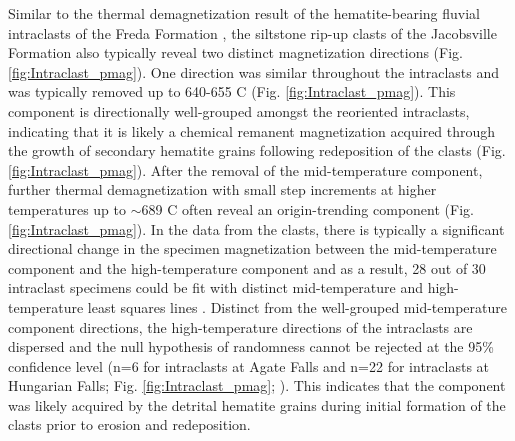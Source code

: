 \documentclass[draft]{agujournal2019}
\begin{document}
Similar to the thermal demagnetization result of the hematite-bearing fluvial intraclasts of the Freda Formation \cite{Swanson-Hysell2019b}, the siltstone rip-up clasts of the Jacobsville Formation also typically reveal two distinct magnetization directions (Fig. \ref{fig:Intraclast_pmag}). One direction was similar throughout the intraclasts and was typically removed up to 640-655 \textdegree C (Fig. \ref{fig:Intraclast_pmag}). This component is directionally well-grouped amongst the reoriented intraclasts, indicating that it is likely a chemical remanent magnetization acquired through the growth of secondary hematite grains following redeposition of the clasts (Fig. \ref{fig:Intraclast_pmag}). After the removal of the mid-temperature component, further thermal demagnetization with small step increments at higher temperatures up to $\sim$689 \textdegree C often reveal an origin-trending component (Fig. \ref{fig:Intraclast_pmag}). In the data from the clasts, there is typically a significant directional change in the specimen magnetization between the mid-temperature component and the high-temperature component and as a result, 28 out of 30 intraclast specimens could be fit with distinct mid-temperature and high-temperature least squares lines \cite{Kirschvink1980a}. Distinct from the well-grouped mid-temperature component directions, the high-temperature directions of the intraclasts are dispersed and the null hypothesis of randomness cannot be rejected at the 95\% confidence level (n=6 for intraclasts at Agate Falls and n=22 for intraclasts at Hungarian Falls; Fig. \ref{fig:Intraclast_pmag}; ). This indicates that the component was likely acquired by the detrital hematite grains during initial formation of the clasts prior to erosion and redeposition. 
\end{document}
